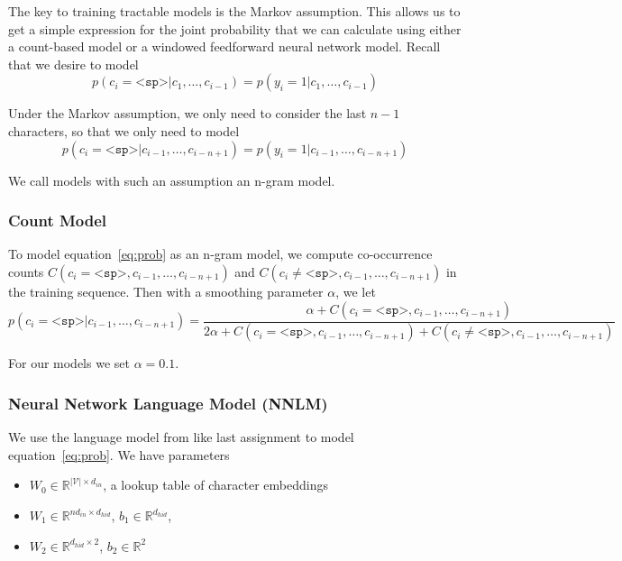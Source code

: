 \documentclass[11pt]{article}
\begin{document}
The key to training tractable models is the Markov assumption. This allows us to get a simple expression for the joint probability that we can calculate using either a count-based model or a windowed feedforward neural network model. Recall that we desire to model
$$p(c_i = \texttt{<sp>} | c_1, \ldots, c_{i-1}) = p(y_i = 1 | c_1, \ldots, c_{i-1})$$

Under the Markov assumption, we only need to consider the last $n-1$ characters, so that we only need to model
\begin{equation}\label{eq:prob}
p(c_i = \texttt{<sp>} | c_{i-1}, \ldots, c_{i-n+1}) = p(y_i = 1 | c_{i-1}, \ldots, c_{i-n+1})
\end{equation}

We call models with such an assumption an n-gram model.

\subsubsection{Count Model}

To model equation~\ref{eq:prob} as an n-gram model, we compute co-occurrence counts $C(c_i = \texttt{<sp>}, c_{i-1}, \ldots, c_{i-n+1})$ and $C(c_i \neq \texttt{<sp>}, c_{i-1}, \ldots, c_{i-n+1})$ in the training sequence. Then with a smoothing parameter $\alpha$, we let
$$p(c_i = \texttt{<sp>} | c_{i-1}, \ldots, c_{i-n+1}) = \frac{\alpha + C(c_i = \texttt{<sp>}, c_{i-1}, \ldots, c_{i-n+1})}{2\alpha + C(c_i = \texttt{<sp>}, c_{i-1}, \ldots, c_{i-n+1}) + C(c_i \neq \texttt{<sp>}, c_{i-1}, \ldots, c_{i-n+1})}$$

For our models we set $\alpha = 0.1$.

\subsubsection{Neural Network Language Model (NNLM)}

We use the language model from \cite{bengio2003nnlm} like last assignment to model equation~\ref{eq:prob}. We have parameters
\begin{itemize}
  \item $W_0 \in \mathbb{R}^{|\mathcal{V}| \times d_{in}}$, a lookup table of character embeddings
  \item $W_1 \in \mathbb{R}^{nd_{in} \times d_{hid}}$, $b_1 \in \mathbb{R}^{d_{hid}}$,
  \item $W_2 \in \mathbb{R}^{d_{hid} \times 2}$, $b_2 \in \mathbb{R}^{2}$
\end{itemize}
\end{document}
